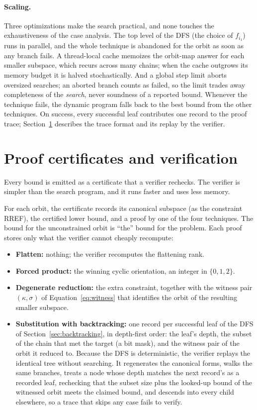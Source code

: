 \documentclass[11pt]{article}
\theoremstyle{definition}
\begin{document}
\paragraph{Scaling.} Three optimizations make the search practical, and none touches
the exhaustiveness of the case analysis. The top level of the DFS (the choice of
$f_{i_1}$) runs in parallel, and the whole technique is abandoned for the orbit
as soon as any branch fails. A thread-local cache memoizes the orbit-map answer
for each smaller subspace, which recurs across many chains; when the cache
outgrows its memory budget it is halved stochastically. And a global step limit
aborts oversized searches; an aborted branch counts as failed, so the limit
trades away completeness of the \emph{search}, never soundness of a reported
bound. Whenever the technique fails, the dynamic program falls back to the best
bound from the other techniques. On success, every successful leaf contributes
one record to the proof trace; Section~\ref{sec:certificates} describes the
trace format and its replay by the verifier.

\section{Proof certificates and verification}\label{sec:certificates}

Every bound is emitted as a certificate that a verifier rechecks.
The verifier is simpler than the search program, and it runs faster and uses less memory.

For each orbit, the certificate records
its canonical subspace (as the constraint RREF), the certified lower bound, and a
proof by one of the four techniques.
The bound for the unconstrained orbit is ``the'' bound for the problem.
Each proof stores only what the
verifier cannot cheaply recompute:
\begin{itemize}
  \item \textbf{Flatten:} nothing; the verifier recomputes the flattening rank.
  \item \textbf{Forced product:} the winning cyclic orientation, an integer in
    $\{0,1,2\}$.
  \item \textbf{Degenerate reduction:} the extra constraint, together with the witness pair
    $(\kappa,\sigma)$ of Equation~\eqref{eq:witness} that identifies the orbit of
    the resulting smaller subspace.
  \item \textbf{Substitution with backtracking:} one record per successful leaf of the DFS of
    Section~\ref{sec:backtracking}, in depth-first order: the leaf's depth, the
    subset of the chain that met the target (a bit mask), and the witness pair
    of the orbit it reduced to. Because the DFS is deterministic, the
    verifier replays the identical tree without searching. It regenerates the
    canonical forms, walks the same branches, treats a node whose depth matches
    the next record's as a recorded leaf, rechecking that the subset size plus
    the looked-up bound of the witnessed orbit meets the claimed bound, and
    descends into every child elsewhere, so a trace that skips any case fails
    to verify.
\end{itemize}
\end{document}
